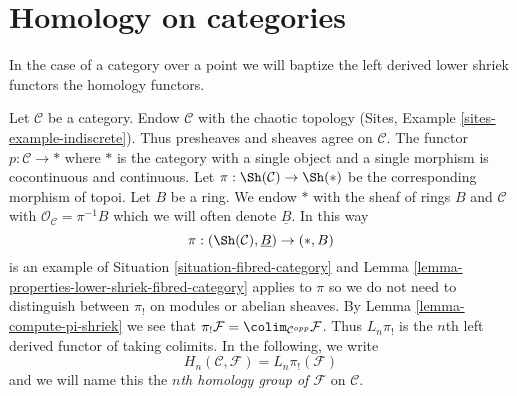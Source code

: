 \section{Homology on categories}
\label{section-homology}

\noindent
In the case of a category over a point we will baptize the left derived
lower shriek functors the homology functors.

\begin{example}
\label{example-category-to-point}
Let $\mathcal{C}$ be a category. Endow $\mathcal{C}$ with the chaotic
topology (Sites, Example \ref{sites-example-indiscrete}). Thus
presheaves and sheaves agree on $\mathcal{C}$.
The functor $p : \mathcal{C} \to *$ where $*$ is the category with a single
object and a single morphism is cocontinuous and continuous. Let
$\pi : \Sh(\mathcal{C}) \to \Sh(*)$ be the corresponding morphism
of topoi. Let $B$ be a ring. We endow $*$ with the sheaf of rings $B$
and $\mathcal{C}$ with $\mathcal{O}_\mathcal{C} = \pi^{-1}B$ which
we will often denote $\underline{B}$. In this way
$$
\pi : (\Sh(\mathcal{C}), \underline{B}) \to (*, B)
$$
is an example of Situation \ref{situation-fibred-category}
and
Lemma \ref{lemma-properties-lower-shriek-fibred-category}
applies to $\pi$ so we do not need to distinguish between $\pi_!$ on
modules or abelian sheaves. By
Lemma \ref{lemma-compute-pi-shriek} we see that
$\pi_!\mathcal{F} = \colim_{\mathcal{C}^{opp}} \mathcal{F}$.
Thus $L_n\pi_!$ is the $n$th left derived functor of taking colimits.
In the following, we write
$$
H_n(\mathcal{C}, \mathcal{F}) = L_n\pi_!(\mathcal{F})
$$
and we will name this the {\it $n$th homology group of $\mathcal{F}$}
on $\mathcal{C}$.
\end{example}

